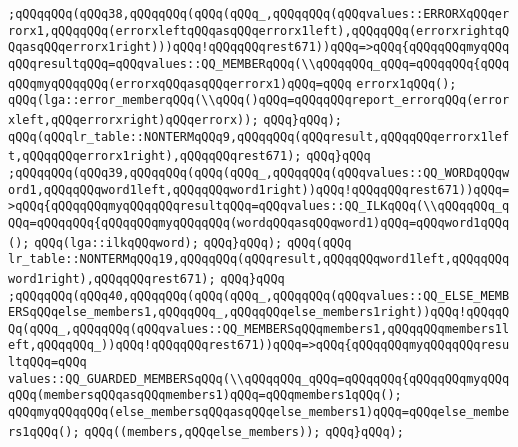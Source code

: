 \verb|;qQQqqQQq(qQQq38,qQQqqQQq(qQQq(qQQq_,qQQqqQQq(qQQqvalues::ERRORXqQQqerrorx1,qQQqqQQq(errorxleftqQQqasqQQqerrorx1left),qQQqqQQq(errorxrightqQQqasqQQqerrorx1right)))qQQq!qQQqqQQqrest671))qQQq=>qQQq{qQQqqQQqmyqQQqqQQqresultqQQq=qQQqvalues::QQ_MEMBERqQQq(\\qQQqqQQq_qQQq=qQQqqQQq{qQQqqQQqmyqQQqqQQq(errorxqQQqasqQQqerrorx1)qQQq=qQQq|\newline
\verb|errorx1qQQq();|\newline
\verb|qQQq(lga::error_memberqQQq(\\qQQq()qQQq=qQQqqQQqreport_errorqQQq(errorxleft,qQQqerrorxright)qQQqerrorx));|\newline
\verb|qQQq}qQQq);|\newline
\verb|qQQq(qQQqlr_table::NONTERMqQQq9,qQQqqQQq(qQQqresult,qQQqqQQqerrorx1left,qQQqqQQqerrorx1right),qQQqqQQqrest671);|\newline
\verb|qQQq}qQQq|\newline
\verb|;qQQqqQQq(qQQq39,qQQqqQQq(qQQq(qQQq_,qQQqqQQq(qQQqvalues::QQ_WORDqQQqword1,qQQqqQQqword1left,qQQqqQQqword1right))qQQq!qQQqqQQqrest671))qQQq=>qQQq{qQQqqQQqmyqQQqqQQqresultqQQq=qQQqvalues::QQ_ILKqQQq(\\qQQqqQQq_qQQq=qQQqqQQq{qQQqqQQqmyqQQqqQQq(wordqQQqasqQQqword1)qQQq=qQQqword1qQQq();|\newline
\verb|qQQq(lga::ilkqQQqword);|\newline
\verb|qQQq}qQQq);|\newline
\verb|qQQq(qQQq|\newline
\verb|lr_table::NONTERMqQQq19,qQQqqQQq(qQQqresult,qQQqqQQqword1left,qQQqqQQqword1right),qQQqqQQqrest671);|\newline
\verb|qQQq}qQQq|\newline
\verb|;qQQqqQQq(qQQq40,qQQqqQQq(qQQq(qQQq_,qQQqqQQq(qQQqvalues::QQ_ELSE_MEMBERSqQQqelse_members1,qQQqqQQq_,qQQqqQQqelse_members1right))qQQq!qQQqqQQq(qQQq_,qQQqqQQq(qQQqvalues::QQ_MEMBERSqQQqmembers1,qQQqqQQqmembers1left,qQQqqQQq_))qQQq!qQQqqQQqrest671))qQQq=>qQQq{qQQqqQQqmyqQQqqQQqresultqQQq=qQQq|\newline
\verb|values::QQ_GUARDED_MEMBERSqQQq(\\qQQqqQQq_qQQq=qQQqqQQq{qQQqqQQqmyqQQqqQQq(membersqQQqasqQQqmembers1)qQQq=qQQqmembers1qQQq();|\newline
\verb|qQQqmyqQQqqQQq(else_membersqQQqasqQQqelse_members1)qQQq=qQQqelse_members1qQQq();|\newline
\verb|qQQq((members,qQQqelse_members));|\newline
\verb|qQQq}qQQq);|\newline
